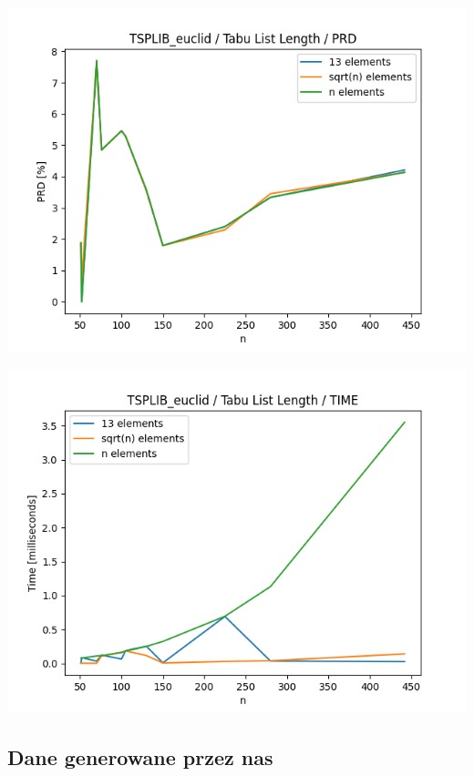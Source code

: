 \documentclass{article}
\begin{document}
\begin{center}
\includegraphics[width=\textwidth, 
                   height = 0.4\textheight, 
                   keepaspectratio]
                  {plots/tabu_tsplib_euclid_prd} 
\end{center}

\begin{center}
\includegraphics[width=\textwidth, 
                   height = 0.4\textheight, 
                   keepaspectratio]
                  {plots/tabu_tsplib_euclid_time} 
\end{center}


\subsection{Dane generowane przez nas}
\end{document}

